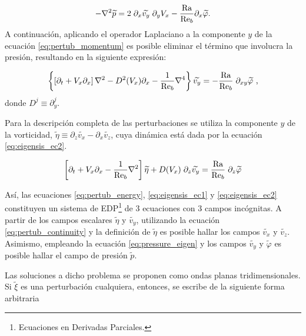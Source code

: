 \begin{equation}
- \nabla^2 \widetilde{p} = 2 \hspace{1mm} \partial_x \widetilde{v_y} \hspace{1mm} \partial_y V_x - \frac{\text{Ra}}{\text{Re}_b} \partial_x \widetilde{\varphi} \text{.}
\label{eq:pressure_eigen}
\end{equation}
A continuación, aplicando el operador Laplaciano a la componente $y$ de la ecuación \ref{eq:pertub_momentum} es posible eliminar el término que involucra la presión, resultando en la siguiente expresión:

\begin{equation}
\left\lbrace \left[ \partial_t + V_x \partial_x \right] \nabla^2 - D^2(V_x) \partial_x - \frac{1}{\text{Re}_b} \nabla^4 \right\rbrace \widetilde{v_y} = - \frac{\text{Ra}}{\text{Re}_b} \hspace{1mm} \partial_{xy} \widetilde{\varphi} \text{ ,}
\label{eq:eigensis_ec1}
\end{equation}
donde $D^j \equiv \partial^j_y$. 

Para la descripción completa de las perturbaciones se utiliza la componente $y$ de la vorticidad, $\widetilde{\eta} \equiv \partial_z \widetilde{v_x} - \partial_x \widetilde{v_z}$, cuya dinámica está dada por la ecuación \ref{eq:eigensis_ec2}.

\begin{equation}
 \left[ \partial_t + V_x \partial_x - \frac{1}{\text{Re}_b} \nabla^2  \right] \widetilde{\eta}  +  D(V_x) \hspace{1mm} \partial_z \widetilde{v_y} = \frac{\text{Ra}}{\text{Re}_b} \hspace{1mm} \partial_{z} \widetilde{\varphi}
\label{eq:eigensis_ec2}
\end{equation}

Así, las ecuaciones \ref{eq:pertub_energy}, \ref{eq:eigensis_ec1} y \ref{eq:eigensis_ec2} constituyen un sistema de EDP\footnote{Ecuaciones en Derivadas Parciales.} de 3 ecuaciones con 3 campos incógnitas. A partir de los campos escalares $\widetilde{\eta}$ y $\widetilde{v_y}$, utilizando la ecuación \ref{eq:pertub_continuity} y la definición de $\widetilde{\eta}$ es posible hallar los campos $\widetilde{v_x}$ y $\widetilde{v_z}$. Asimismo, empleando la ecuación \ref{eq:pressure_eigen} y los campos $\widetilde{v_y}$ y  $\widetilde{\varphi}$ es posible hallar el campo de presión  $\widetilde{p}$. 

Las soluciones a dicho problema se proponen como ondas planas tridimensionales. Si $\widetilde{\xi}$ es una perturbación cualquiera, entonces, se escribe de la siguiente forma arbitraria

